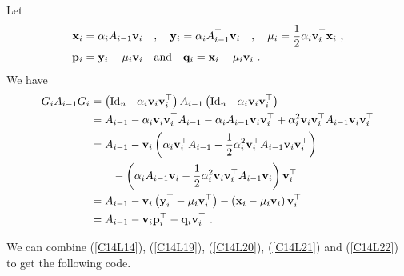 Let
\begin{equation}\label{C14L21}
\begin{split}
\mathbf{x}_i &= \alpha_i A_{i-1} \mathbf{v}_i \quad  , \quad
\mathbf{y}_i = \alpha_i A_{i-1}^\top \mathbf{v}_i \quad , \quad
\mu_i = \frac{1}{2} \alpha_i \mathbf{v}_i^\top \mathbf{x}_i \  , \\
\mathbf{p}_i &= \mathbf{y}_i - \mu_i \mathbf{v}_i \quad \text{and} \quad
\mathbf{q}_i = \mathbf{x}_i - \mu_i \mathbf{v}_i \  .
\end{split}
\end{equation}
We have
\begin{align}
G_i A_{i-1}G_i &= \left( \operatorname{Id}_n - \alpha_i \mathbf{v}_i \mathbf{v}_i^\top\right)
A_{i-1} \left( \operatorname{Id}_n - \alpha_i \mathbf{v}_i \mathbf{v}_i^\top \right) \nonumber \\
&= A_{i-1} - \alpha_i \mathbf{v}_i \mathbf{v}_i^\top A_{i-1} -
\alpha_i A_{i-1} \mathbf{v}_i \mathbf{v}_i^\top
+ \alpha_i^2 \mathbf{v}_i \mathbf{v}_i^\top A_{i-1} \mathbf{v}_i \mathbf{v}_i^\top
\nonumber \\
&= A_{i-1} - \mathbf{v}_i \left( \alpha_i \mathbf{v}_i^\top A_{i-1}
- \frac{1}{2} \alpha_i^2 \mathbf{v}_i^\top A_{i-1} \mathbf{v}_i \mathbf{v}_i^\top
\right) \nonumber \\
&\qquad
- \left( \alpha_i A_{i-1} \mathbf{v}_i
- \frac{1}{2} \alpha_i^2 \mathbf{v}_i \mathbf{v}_i^\top A_{i-1} \mathbf{v}_i \right)
\mathbf{v}_i^\top \nonumber \\
&= A_{i-1} - \mathbf{v}_i \left( \mathbf{y}_i^\top - \mu_i \mathbf{v}_i^\top \right)
- \left( \mathbf{x}_i - \mu_i \mathbf{v}_i \right) \mathbf{v}_i^\top \nonumber \\
&= A_{i-1} - \mathbf{v}_i \mathbf{p}_i^\top - \mathbf{q}_i \mathbf{v}_i^\top \  .
\label{C14L22}
\end{align}

We can combine (\ref{C14L14}), (\ref{C14L19}), (\ref{C14L20}),
(\ref{C14L21}) and (\ref{C14L22}) to get the following code.


